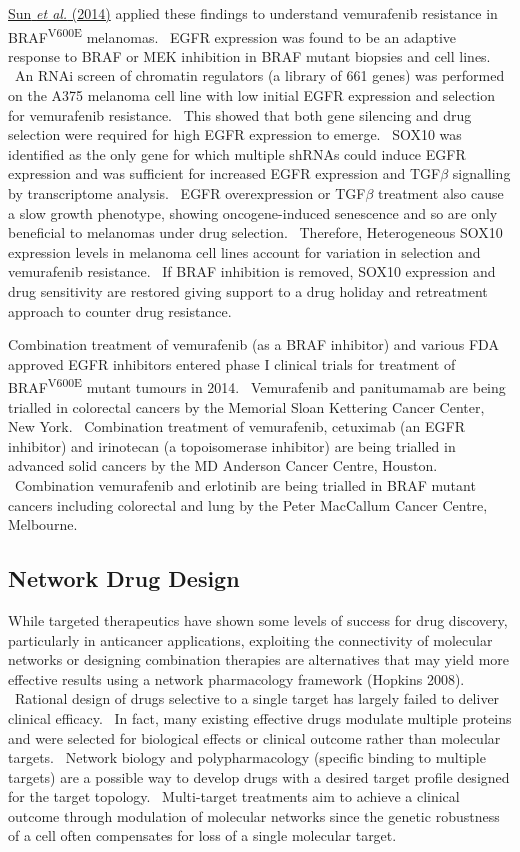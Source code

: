 \hyperlink{ENREF92}{Sun}\hyperlink{ENREF92}{\textit{ et
al.}}\hyperlink{ENREF92}{ (2014)} applied these findings to understand
vemurafenib resistance in BRAF\textsuperscript{V600E} melanomas. \ EGFR
expression was found to be an adaptive response to BRAF or MEK
inhibition in BRAF mutant biopsies and cell lines. \ An RNAi screen of
chromatin regulators (a library of 661 genes) was performed on the A375
melanoma cell line with low initial EGFR expression and selection for
vemurafenib resistance. \ This showed that both gene silencing and drug
selection were required for high EGFR expression to emerge. \ SOX10 was
identified as the only gene for which multiple shRNAs could induce EGFR
expression and was sufficient for increased EGFR expression and
TGF$\beta $ signalling by transcriptome analysis. \ EGFR overexpression
or TGF$\beta $ treatment also cause a slow growth phenotype, showing
oncogene-induced senescence and so are only beneficial to melanomas
under drug selection. \ Therefore, Heterogeneous SOX10 expression
levels in melanoma cell lines account for variation in selection and
vemurafenib resistance. \ If BRAF inhibition is removed, SOX10
expression and drug sensitivity are restored giving support to a drug
holiday and retreatment approach to counter drug resistance. \ 


Combination treatment of vemurafenib (as a BRAF inhibitor) and various
FDA approved EGFR inhibitors entered phase I clinical trials for
treatment of BRAF\textsuperscript{V600E} mutant tumours in 2014.
\ Vemurafenib and panitumamab are being trialled in colorectal cancers
by the Memorial Sloan Kettering Cancer Center, New York. \ Combination
treatment of vemurafenib, cetuximab (an EGFR inhibitor) and irinotecan
(a topoisomerase inhibitor) are being trialled in advanced solid
cancers by the MD Anderson Cancer Centre, Houston. \ Combination
vemurafenib and erlotinib are being trialled in BRAF mutant cancers
including colorectal and lung by the Peter MacCallum Cancer Centre,
Melbourne. \ 


\subsection[Network Drug Design]{Network Drug Design}

While targeted therapeutics have shown some levels of success for drug
discovery, particularly in anticancer applications, exploiting the
connectivity of molecular networks or designing combination therapies
are alternatives that may yield more effective results using a network
pharmacology framework (Hopkins 2008). \ Rational design of drugs
selective to a single target has largely failed to deliver clinical
efficacy. \ In fact, many existing effective drugs modulate multiple
proteins and were selected for biological effects or clinical outcome
rather than molecular targets. \ Network biology and polypharmacology
(specific binding to multiple targets) are a possible way to develop
drugs with a desired target profile designed for the target topology.
\ Multi-target treatments aim to achieve a clinical outcome through
modulation of molecular networks since the genetic robustness of a cell
often compensates for loss of a single molecular target. \ 


